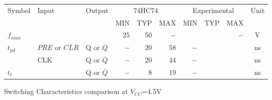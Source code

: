 \begin{tabular}{|l|l|l|r|r|r|r|r|r|c|}
    \toprule
    Symbol  &Input  &Output &\multicolumn{3}{|c|}{74HC74}&\multicolumn{3}{|c|}{Experimental}&Unit\\
            &       &       &       MIN&TYP&MAX          &          MIN&TYP&MAX             &    \\
    \midrule
    $f_{max}$&  &   &25&50&$-$&  &  &$-$&V\\
    \multirow{2}{*}{$t_{pd}$}   &$\overline{PRE}$ or $\overline{CLR}$&Q or $\overline{Q}$&$-$&20&58&$-$&   &   &ns\\
                                &CLK&Q or $\overline{Q}$&$-$&20&44&$-$&   &   &ns\\
    $t_{t}$&    &Q or $\overline{Q}$&$-$&8&19&$-$&   &   &ns\\
    \bottomrule
\end{tabular}
\caption{Switching Characteristics comparison at $V_{CC}$=4.5V}